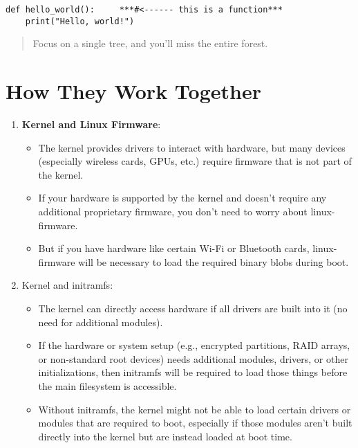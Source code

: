 \begin{lstlisting}[caption={\smaller Sample Code}]
def hello_world():     ***#<------ this is a function***
    print("Hello, world!")
\end{lstlisting}

\begin{quote}
Focus on a single tree, and you'll miss the entire forest.
\end{quote}

\section{How They Work Together}
\begin{enumerate}
  \item \textbf{Kernel and Linux Firmware}:
    \begin{itemize}
        \item The kernel provides drivers to interact with hardware, but many devices (especially wireless cards, GPUs, etc.) require firmware that is not part of the kernel.
        \item If your hardware is supported by the kernel and doesn't require any additional proprietary firmware, you don’t need to worry about linux-firmware.
        \item But if you have hardware like certain Wi-Fi or Bluetooth cards, linux-firmware will be necessary to load the required binary blobs during boot.
    \end{itemize}
\item Kernel and initramfs:
    \begin{itemize}
        \item The kernel can directly access hardware if all drivers are built into it (no need for additional modules).
        \item If the hardware or system setup (e.g., encrypted partitions, RAID arrays, or non-standard root devices) needs additional modules, drivers, or other initializations, then initramfs will be required to load those things before the main filesystem is accessible.
        \item Without initramfs, the kernel might not be able to load certain drivers or modules that are required to boot, especially if those modules aren’t built directly into the kernel but are instead loaded at boot time.
    \end{itemize}
\end{enumerate}

